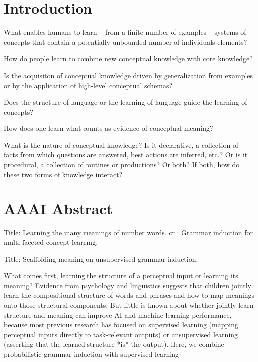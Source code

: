 \documentclass{article}
\begin{document}
\section*{Introduction}
What enables humans to learn -- from a finite number of examples --
systems of concepts that contain a potentially unbounded number of
individuals elements? 

How do people learn to combine new conceptual knowledge with core knowledge?

Is the acquisiton of conceptual knowledge driven by generalization
from examples or by the application of high-level conceptual schemas?

Does the structure of language or the learning of language guide
the learning of concepts? 

How does one learn what counts as evidence of conceptual meaning?  

What is the nature of conceptual knowledge? Is it declarative, a
collection of facts from which questions are answered, best actions
are inferred, etc.? Or is it procedural, a collection of routines or
productions? Or both? If both, how do these two forms of knowledge
interact? 

\section*{AAAI Abstract}
Title: Learning the many meanings of number words. 
or   : Grammar induction for multi-faceted concept learning. 

Title: Scaffolding meaning on unsupervised grammar induction.

What comes first, learning the structure of a perceptual input or
learning its meaning? Evidence from psychology and linguistics
suggests that children jointly learn the compositional structure of
words and phrases and how to map meanings onto those structural
components. But little is known about whether jointly learn structure
and meaning can improve AI and machine learning performance, because
most previous research has focused on supervised learning (mapping
perceptual inputs directly to task-relevant outputs) or unsupervised
learning (asserting that the learned structure *is* the output). Here,
we combine probabilistic grammar induction with supervised learning
\end{document}

